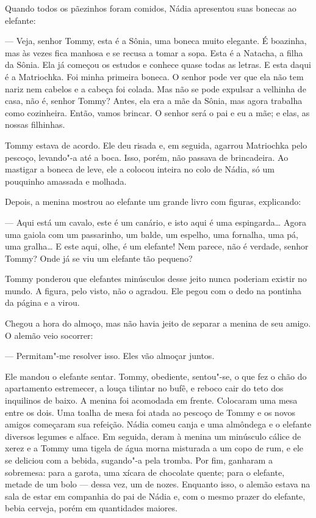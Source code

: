 Quando todos os pãezinhos foram comidos, Nádia apresentou suas bonecas
ao elefante:

--- Veja, senhor Tommy, esta é a Sônia, uma boneca muito elegante. É boazinha, mas às vezes fica manhosa e se recusa a tomar a sopa.
Esta é a Natacha, a filha da Sônia. Ela já começou os estudos e conhece
quase todas as letras. E esta daqui é a Matriochka. Foi minha primeira
boneca. O senhor pode ver que ela não tem nariz nem cabelos e a cabeça
foi colada. Mas não se pode expulsar a velhinha de casa, não é, senhor Tommy? Antes, ela era a mãe da Sônia, mas agora trabalha como
cozinheira. Então, vamos brincar. O senhor será o pai e eu a mãe; e
elas, as nossas filhinhas.

Tommy estava de acordo. Ele deu risada e, em seguida, agarrou Matriochka
pelo pescoço, levando"-a até a boca. Isso, porém, não passava de
brincadeira. Ao mastigar a boneca de leve, ele a colocou inteira no colo
de Nádia, só um pouquinho amassada e molhada.

Depois, a menina mostrou ao elefante um grande livro com figuras,
explicando:

--- Aqui está um cavalo, este é um canário, e isto aqui é uma
espingarda\ldots{} Agora uma gaiola com um passarinho, um balde, um espelho,
uma fornalha, uma pá, uma gralha\ldots{} E este aqui, olhe, é um elefante!
Nem parece, não é verdade, senhor Tommy? Onde já se viu um elefante tão
pequeno?

Tommy ponderou que elefantes minúsculos desse jeito nunca poderiam existir no
mundo. A figura, pelo visto, não o agradou. Ele pegou com o dedo na
pontinha da página e a virou.

Chegou a hora do almoço, mas não havia jeito de separar a menina de seu
amigo. O alemão veio socorrer:

--- Permitam"-me resolver isso. Eles vão almoçar juntos.

Ele mandou o elefante sentar. Tommy, obediente, sentou"-se, o que fez o
chão do apartamento estremecer, a louça tilintar no bufê, e reboco cair
do teto dos inquilinos de baixo. A menina foi acomodada em frente.
Colocaram uma mesa entre os dois. Uma toalha de mesa foi atada ao
pescoço de Tommy e os novos amigos começaram sua refeição. Nádia comeu
canja e uma almôndega e o elefante diversos legumes e alface. Em
seguida, deram à menina um minúsculo cálice de xerez e a Tommy uma
tigela de água morna misturada a um copo de rum, e ele se deliciou com a
bebida, sugando"-a pela tromba. Por fim, ganharam a sobremesa: para a
garota, uma xícara de chocolate quente; para o elefante, metade de um
bolo --- dessa vez, um de nozes. Enquanto isso, o alemão estava na sala
de estar em companhia do pai de Nádia e, com o mesmo prazer do elefante,
bebia cerveja, porém em quantidades maiores.

